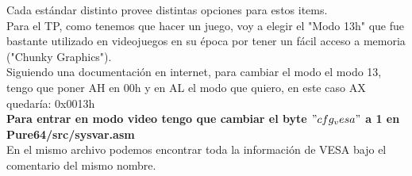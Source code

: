 \documentclass[]{article}
\begin{document}
Cada est\'andar distinto provee distintas opciones para estos items.\\

Para el TP, como tenemos que hacer un juego, voy a elegir el "Modo 13h" que fue bastante utilizado en videojuegos en su \'epoca por tener un f\'acil acceso a memoria ("Chunky Graphics").\\

Siguiendo una documentaci\'on en internet, para cambiar el modo el modo 13, tengo que poner AH en 00h y en AL el modo que quiero, en este caso AX quedar\'ia: 0x0013h\\

\textbf{Para entrar en modo video tengo que cambiar el byte $"cfg_vesa"$ a 1 en Pure64/src/sysvar.asm}\\

En el mismo archivo podemos encontrar toda la informaci\'on de VESA bajo el comentario del mismo nombre.
\end{document}

